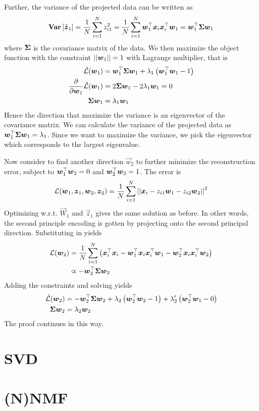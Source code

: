 Further, the variance of the projected data can be written as
\begin{align*}
	\mathbf{Var}\left[\tilde{\boldsymbol{z}}_1\right]=\frac{1}{N}\sum_{i=1}^Nz_{i1}^2=\frac{1}{N}\sum_{i=1}^N\boldsymbol{w}_1^\top\boldsymbol{x}_i\boldsymbol{x}_i^\top\boldsymbol{w}_1=\boldsymbol{w}_1^\top\mathbf{\Sigma}\boldsymbol{w}_1
\end{align*}
where $\mathbf{\Sigma}$ is the covariance matrix of the data. We then maximize the object function with the constraint $\left\vert\left\vert \boldsymbol{w}_1 \right\vert\right\vert=1$ with Lagrange multiplier, that is
\begin{align*}
	\tilde{\mathcal{L}}(\boldsymbol{w}_1)&=\boldsymbol{w}_1^\top\mathbf{\Sigma}\boldsymbol{w}_1+\lambda_1\left(\boldsymbol{w}_1^\top\boldsymbol{w}_1-1\right) \\
	\frac{\partial}{\partial\boldsymbol{w}_1}\tilde{\mathcal{L}}(\boldsymbol{w}_1)&=2\mathbf{\Sigma}\boldsymbol{w}_1-2\lambda_1\boldsymbol{w}_1=0 \\
	\mathbf{\Sigma}\boldsymbol{w}_1&=\lambda_1\boldsymbol{w}_1
\end{align*}
Hence the direction that maximize the variance is an eigenvector of the covariance matrix. We can calculate the variance of the projected data as $\boldsymbol{w}_1^\top\mathbf{\Sigma}\boldsymbol{w}_1=\lambda_1$. Since we want to maximize the variance, we pick the eigenvector which corresponds to the largest eigenvalue.

Now consider to find another direction $\vec{w}_2$ to further minimize the reconstruction error, subject to $\boldsymbol{w}_1^\top\boldsymbol{w}_2=0$ and $\boldsymbol{w}_2^\top\boldsymbol{w}_2=1$. The error is
\begin{align*}
	\mathcal{L}(\boldsymbol{w}_1,\boldsymbol{z}_1,\boldsymbol{w}_2,\boldsymbol{z}_2)=\frac{1}{N}\sum_{i=1}^N\left\vert\left\vert \boldsymbol{x}_i-z_{i1}\boldsymbol{w}_1-z_{i2}\boldsymbol{w}_2 \right\vert\right\vert^2
\end{align*}
Optimizing w.r.t. $\vec{W}_1$ and $\vec{z}_1$ gives the same solution as before. In other words, the second principle encoding is gotten by projecting onto the second principal direction. Substituting in yields
\begin{align*}
	\mathcal{L}(\boldsymbol{w}_2)&=\frac{1}{N}\sum_{i=1}^N\left(\boldsymbol{x}_i^\top\boldsymbol{x}_i-\boldsymbol{w}_1^\top\boldsymbol{x}_i\boldsymbol{x}_i^\top\boldsymbol{w}_1-\boldsymbol{w}_2^\top\boldsymbol{x}_i\boldsymbol{x}_i^\top\boldsymbol{w}_2\right) \\
	&\varpropto-\boldsymbol{w}_2^\top\mathbf{\Sigma}\boldsymbol{w}_2
\end{align*}
Adding the constraints and solving yields
\begin{align*}
	\tilde{\mathcal{L}}(\boldsymbol{w}_2)&=-\boldsymbol{w}_2^\top\mathbf{\Sigma}\boldsymbol{w}_2+\lambda_2\left(\boldsymbol{w}_2^\top\boldsymbol{w}_2-1\right)+\lambda_2'\left(\boldsymbol{w}_2^\top\boldsymbol{w}_1-0\right) \\
	\mathbf{\Sigma}\boldsymbol{w}_2&=\lambda_2\boldsymbol{w}_2
\end{align*}
The proof continues in this way.

\section{SVD}

\section{(N)NMF}
